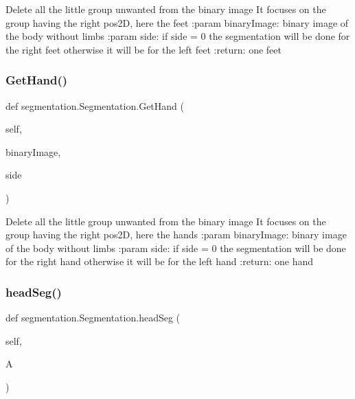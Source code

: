 \begin{DoxyVerb}Delete all the little group unwanted from the binary image
It focuses on the group having the right pos2D, here the feet
:param binaryImage: binary image of the body without limbs
:param side: if side = 0 the segmentation will be done for the right feet
  otherwise it will be for the left feet
:return: one feet
\end{DoxyVerb}
 \mbox{\label{classsegmentation_1_1_segmentation_ac40379d03b4adb8c368d7d7d12e0d321}} 
\subsubsection{\texorpdfstring{Get\+Hand()}{GetHand()}}
{\footnotesize\ttfamily def segmentation.\+Segmentation.\+Get\+Hand (\begin{DoxyParamCaption}\item[{}]{self,  }\item[{}]{binary\+Image,  }\item[{}]{side }\end{DoxyParamCaption})}

\begin{DoxyVerb}Delete all the little group unwanted from the binary image
It focuses on the group having the right pos2D, here the hands
:param binaryImage: binary image of the body without limbs
:param side: if side = 0 the segmentation will be done for the right hand
  otherwise it will be for the left hand
:return: one hand
\end{DoxyVerb}
 \mbox{\label{classsegmentation_1_1_segmentation_a57bb91652be301652103fa04944fced9}} 
\subsubsection{\texorpdfstring{head\+Seg()}{headSeg()}}
{\footnotesize\ttfamily def segmentation.\+Segmentation.\+head\+Seg (\begin{DoxyParamCaption}\item[{}]{self,  }\item[{}]{A }\end{DoxyParamCaption})}

